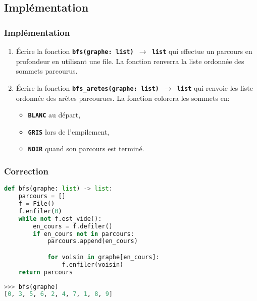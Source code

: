 \documentclass[svgnames,11pt]{beamer}
\begin{document}
\subsection{Implémentation}
\begin{frame}
    \frametitle{Implémentation}

    \begin{activite}
        \begin{enumerate}
            \item Écrire la fonction \textbf{\texttt{bfs(graphe: list) $\rightarrow$ list}} qui effectue un parcours en profondeur en utilisant une file. La fonction renverra la liste ordonnée des sommets parcourus.
            \item Écrire la fonction \textbf{\texttt{bfs\_aretes(graphe: list) $\rightarrow$ list}} qui renvoie les liste ordonnée des arêtes parcourues. La fonction colorera les sommets en:
            \begin{itemize}
                \item \textbf{\texttt{BLANC}} au départ,
                \item \textbf{\texttt{GRIS}} lors de l'empilement,
                \item \textbf{\texttt{NOIR}} quand son parcours est terminé.
            \end{itemize}
        \end{enumerate}
        \end{activite}

\end{frame}
\begin{frame}[fragile]
    \frametitle{Correction}
\begin{center}
\begin{lstlisting}[language=Python , basicstyle=\ttfamily\small, xleftmargin=2em, xrightmargin=2em]
def bfs(graphe: list) -> list:
    parcours = []
    f = File()
    f.enfiler(0)
    while not f.est_vide():
        en_cours = f.defiler()
        if en_cours not in parcours:
            parcours.append(en_cours)

            for voisin in graphe[en_cours]:
                f.enfiler(voisin)
    return parcours
\end{lstlisting}
\begin{lstlisting}[language=Python , basicstyle=\ttfamily\small, xleftmargin=2em, xrightmargin=2em]
>>> bfs(graphe)
[0, 3, 5, 6, 2, 4, 7, 1, 8, 9]
\end{lstlisting}
\end{center}
    

\end{frame}
\end{document}
